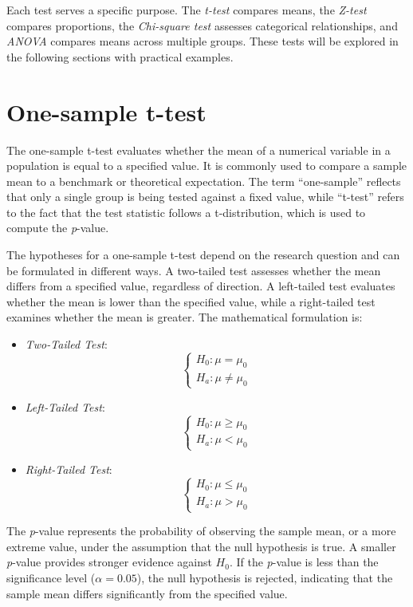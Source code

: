 \documentclass[
  11pt,
]{book}
\providecommand{\tightlist}{%
  \setlength{\itemsep}{0pt}\setlength{\parskip}{0pt}}
\theoremstyle{definition}
\theoremstyle{definition}
\theoremstyle{definition}
\theoremstyle{definition}
\theoremstyle{remark}
\begin{document}
Each test serves a specific purpose. The \emph{t-test} compares means, the \emph{Z-test} compares proportions, the \emph{Chi-square test} assesses categorical relationships, and \emph{ANOVA} compares means across multiple groups. These tests will be explored in the following sections with practical examples.

\section{One-sample t-test}\label{one-sample-t-test}

The one-sample t-test evaluates whether the mean of a numerical variable in a population is equal to a specified value. It is commonly used to compare a sample mean to a benchmark or theoretical expectation. The term ``one-sample'' reflects that only a single group is being tested against a fixed value, while ``t-test'' refers to the fact that the test statistic follows a t-distribution, which is used to compute the \emph{p}-value.

The hypotheses for a one-sample t-test depend on the research question and can be formulated in different ways. A two-tailed test assesses whether the mean differs from a specified value, regardless of direction. A left-tailed test evaluates whether the mean is lower than the specified value, while a right-tailed test examines whether the mean is greater. The mathematical formulation is:

\begin{itemize}
\tightlist
\item
  \emph{Two-Tailed Test}:
  \[
  \begin{cases}
  H_0:  \mu   =  \mu_0 \\
  H_a:  \mu \neq \mu_0
  \end{cases}
  \]
\item
  \emph{Left-Tailed Test}:
  \[
  \begin{cases}
  H_0:  \mu \geq \mu_0 \\
  H_a:  \mu  <   \mu_0
  \end{cases}
  \]
\item
  \emph{Right-Tailed Test}:
  \[
  \begin{cases}
  H_0:  \mu \leq \mu_0 \\
  H_a:  \mu >   \mu_0
  \end{cases}
  \]
\end{itemize}

The \emph{p}-value represents the probability of observing the sample mean, or a more extreme value, under the assumption that the null hypothesis is true. A smaller \emph{p}-value provides stronger evidence against \(H_0\). If the \emph{p}-value is less than the significance level (\(\alpha = 0.05\)), the null hypothesis is rejected, indicating that the sample mean differs significantly from the specified value.
\end{document}

